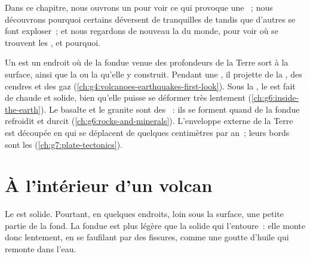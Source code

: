 Dans ce chapitre, nous ouvrons un  pour voir ce qui provoque une
~; nous découvrons pourquoi certains  déversent de
tranquilles  de  tandis que d'autres se font exploser~; et
nous regardons de nouveau la  du monde, pour voir où se trouvent les
, et pourquoi.

\begin{recall}
Un \emph{} est un endroit où de la  fondue venue des profondeurs
de la Terre sort à la surface, ainsi que la  ou la  qu'elle
y construit. Pendant une \emph{}, il projette de la , des
cendres et des gaz (\cref{ch:g4:volcanoes-earthquakes-first-look}). Sous la
, le  est fait de  chaude et solide, bien qu'elle puisse
se déformer très lentement (\cref{ch:g6:inside-the-earth}). Le basalte et le
granite sont des ~: ils se forment quand de la  fondue
refroidit et durcit (\cref{ch:g6:rocks-and-minerals}). L'enveloppe externe
de la Terre est découpée en  qui se déplacent de quelques
centimètres par an~; leurs bords sont les 
(\cref{ch:g7:plate-tectonics}).
\end{recall}

\section{À l'intérieur d'un volcan}

Le  est solide. Pourtant, en quelques endroits, loin sous la
surface, une petite partie de la  fond. La  fondue est plus
légère que la  solide qui l'entoure~: elle monte donc lentement, en se
faufilant par des fissures, comme une goutte d'huile qui remonte dans
l'eau.

